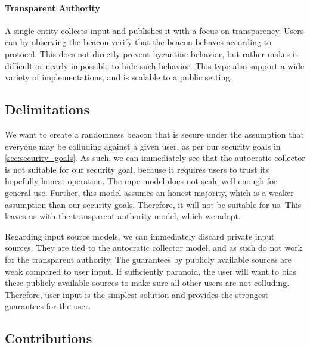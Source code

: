 \paragraph{Transparent Authority} A single entity collects input and publishes it with a focus on transparency. Users can by observing the beacon verify that the beacon behaves according to protocol. This does not directly prevent byzantine behavior, but rather makes it difficult or nearly impossible to hide such behavior. This type also support a wide variety of implementations, and is scalable to a public setting.

\subsection{Delimitations}%
\label{sub:delimitations}
We want to create a randomness beacon that is secure under the assumption that everyone may be colluding against a given user, as per our security goals in \cref{sec:security_goals}. As such, we can immediately see that the autocratic collector is not suitable for our security goal, because it requires users to trust its hopefully honest operation. The \gls{mpc} model does not scale well enough for general use. Further, this model assumes an honest majority, which is a weaker assumption than our security goals. Therefore, it will not be suitable for us. This leaves us with the transparent authority model, which we adopt.

Regarding input source models, we can immediately discard private input sources. They are tied to the autocratic collector model, and as such do not work for the transparent authority. The guarantees by publicly available sources are weak compared to user input. If sufficiently paranoid, the user will want to bias these publicly available sources to make sure all other users are not colluding. Therefore, user input is the simplest solution and provides the strongest guarantees for the user.

\subsection{Contributions}
